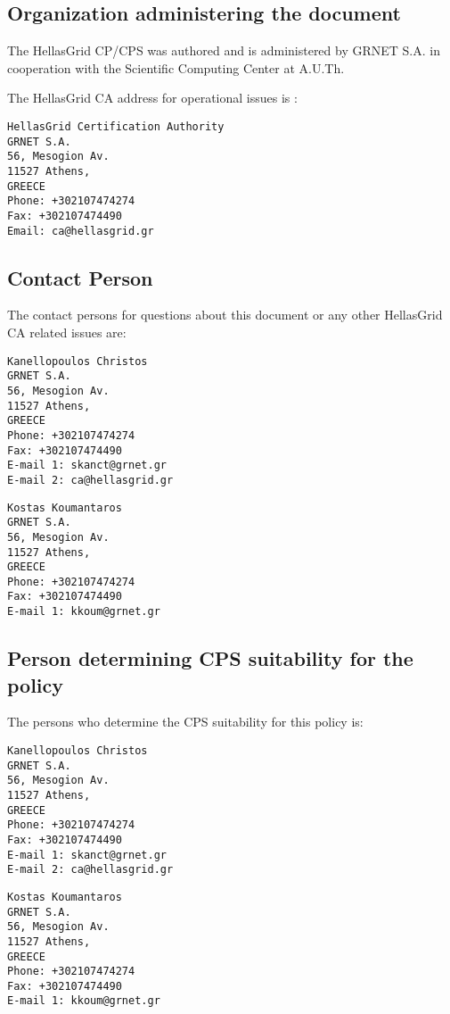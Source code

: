 \subsection{Organization administering the document}
\label{sub:OrganizationAdministeringTheDocument}

The HellasGrid CP/CPS was authored and is administered by GRNET S.A. in cooperation with the Scientific Computing Center at A.U.Th.

The HellasGrid CA address for operational issues is :

\begin{verbatim}
HellasGrid Certification Authority
GRNET S.A.
56, Mesogion Av.
11527 Athens,
GREECE
Phone: +302107474274
Fax: +302107474490
Email: ca@hellasgrid.gr
\end{verbatim}

\subsection{Contact Person}
\label{sub:ContactPerson}

The contact persons for questions about this document or any other HellasGrid CA related issues are:

\begin{verbatim}
Kanellopoulos Christos
GRNET S.A.
56, Mesogion Av.
11527 Athens,
GREECE
Phone: +302107474274
Fax: +302107474490
E-mail 1: skanct@grnet.gr
E-mail 2: ca@hellasgrid.gr
\end{verbatim}

\begin{verbatim}
Kostas Koumantaros
GRNET S.A.
56, Mesogion Av.
11527 Athens,
GREECE
Phone: +302107474274
Fax: +302107474490
E-mail 1: kkoum@grnet.gr
\end{verbatim}

\subsection{Person determining CPS suitability for the policy}

The persons who determine the CPS suitability for this policy is:

\begin{verbatim}
Kanellopoulos Christos
GRNET S.A.
56, Mesogion Av.
11527 Athens,
GREECE
Phone: +302107474274
Fax: +302107474490
E-mail 1: skanct@grnet.gr
E-mail 2: ca@hellasgrid.gr
\end{verbatim}

\begin{verbatim}
Kostas Koumantaros
GRNET S.A.
56, Mesogion Av.
11527 Athens,
GREECE
Phone: +302107474274
Fax: +302107474490
E-mail 1: kkoum@grnet.gr
\end{verbatim}


